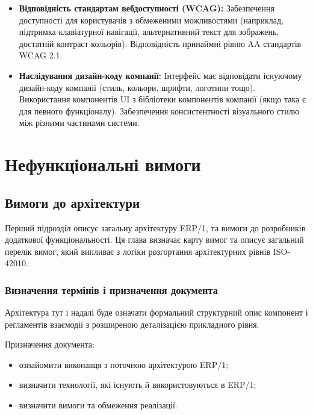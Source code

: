 \documentclass{article}
\begin{document}
\begin{itemize}
    \item \textbf{Відповідність стандартам вебдоступності (WCAG):} Забезпечення доступності для
           користувачів з обмеженими можливостями (наприклад, підтримка клавіатурної навігації,
           альтернативний текст для зображень, достатній контраст кольорів). Відповідність принаймні рівню AA стандартів WCAG 2.1.
    \item \textbf{Наслідування дизайн-коду компанії:} Інтерфейс має відповідати існуючому дизайн-коду
           компанії (стиль, кольори, шрифти, логотипи тощо). Використання компонентів UI з бібліотеки
           компонентів компанії (якщо така є для певного функціоналу). Забезпечення консистентності
           візуального стилю між різними частинами системи.
\end{itemize}

\newpage
\section{Нефункціональні вимоги}

\subsection{Вимоги до архітектури}

Перший підрозділ описує загальну архітектуру ERP/1, та вимоги до розробників додаткової функціональності.
Ця глава визначає карту вимог та описує загальний перелік вимог, який випливає з логіки розгортання
архітектурних рівнів ISO-42010.

\subsubsection{Визначення термінів і призначення документа}

Архітектура тут і надалі буде означати формальний структурний опис компонент і регламентів взаємодії з розширеною деталізацією прикладного рівня.

Призначення документа:
\begin{itemize}
  \item ознайомити виконавця з поточною архітектурою ERP/1;
  \item визначити технології, які існують й використовуються в ERP/1;
  \item визначити вимоги та обмеження реалізації.
\end{itemize}
\end{document}
